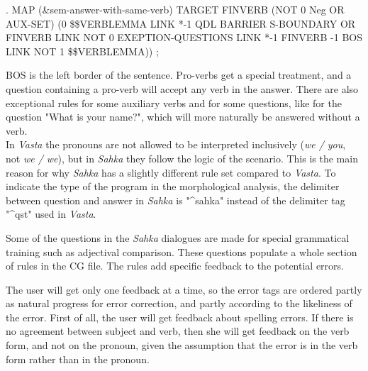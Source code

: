 \documentclass[11pt]{article}
\begin{document}
\ex.\flushleft\label{sameverb} \small{MAP (\&sem-answer-with-same-verb) TARGET FINVERB (NOT 0 Neg OR AUX-SET) (0 \$\$VERBLEMMA LINK *-1 QDL BARRIER S-BOUNDARY OR FINVERB LINK NOT 0 EXEPTION-QUESTIONS LINK *-1 FINVERB -1 BOS LINK NOT 1 \$\$VERBLEMMA)) ;}

BOS is the left border of the sentence. Pro-verbs get a special treatment, and a question containing a pro-verb will accept any verb in the answer. There are also exceptional rules for some auxiliary verbs and for some questions, like for the question "What is your name?", which will more naturally be answered without a verb. \\




In \textit{Vasta} the pronouns are not allowed to be interpreted inclusively (\textit{we / you}, not \textit{we / we}), but in \textit{Sahka} they follow the logic of the scenario. This is the main reason for why \textit{Sahka} has a slightly different rule set compared to \textit{Vasta}. To indicate the type of the program in the morphological analysis, the delimiter between question and answer in \textit{Sahka} is "\^{}sahka" instead of the delimiter tag "\^{}qst" used in \textit{Vasta}.
 
Some of the questions in the \textit{Sahka} dialogues are made for special grammatical training such as adjectival comparison. These questions populate a whole section of rules in the CG file. The rules add specific feedback to the potential errors.

The user will get only one feedback at a time, so the error tags are ordered partly as natural progress for error correction, and partly according to the likeliness of the error. First of all, the user will get feedback about spelling errors. If there is no agreement between subject and verb, then she will get feedback on the verb form, and not on the pronoun, given the assumption that the error is in the verb form rather than in the pronoun.
\end{document}
